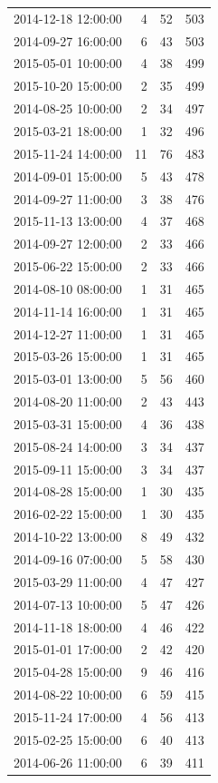\begin{tabular}{lrrr}
2014-12-18 12:00:00 & 4 & 52 & 503 \\
2014-09-27 16:00:00 & 6 & 43 & 503 \\
2015-05-01 10:00:00 & 4 & 38 & 499 \\
2015-10-20 15:00:00 & 2 & 35 & 499 \\
2014-08-25 10:00:00 & 2 & 34 & 497 \\
2015-03-21 18:00:00 & 1 & 32 & 496 \\
2015-11-24 14:00:00 & 11 & 76 & 483 \\
2014-09-01 15:00:00 & 5 & 43 & 478 \\
2014-09-27 11:00:00 & 3 & 38 & 476 \\
2015-11-13 13:00:00 & 4 & 37 & 468 \\
2014-09-27 12:00:00 & 2 & 33 & 466 \\
2015-06-22 15:00:00 & 2 & 33 & 466 \\
2014-08-10 08:00:00 & 1 & 31 & 465 \\
2014-11-14 16:00:00 & 1 & 31 & 465 \\
2014-12-27 11:00:00 & 1 & 31 & 465 \\
2015-03-26 15:00:00 & 1 & 31 & 465 \\
2015-03-01 13:00:00 & 5 & 56 & 460 \\
2014-08-20 11:00:00 & 2 & 43 & 443 \\
2015-03-31 15:00:00 & 4 & 36 & 438 \\
2015-08-24 14:00:00 & 3 & 34 & 437 \\
2015-09-11 15:00:00 & 3 & 34 & 437 \\
2014-08-28 15:00:00 & 1 & 30 & 435 \\
2016-02-22 15:00:00 & 1 & 30 & 435 \\
2014-10-22 13:00:00 & 8 & 49 & 432 \\
2014-09-16 07:00:00 & 5 & 58 & 430 \\
2015-03-29 11:00:00 & 4 & 47 & 427 \\
2014-07-13 10:00:00 & 5 & 47 & 426 \\
2014-11-18 18:00:00 & 4 & 46 & 422 \\
2015-01-01 17:00:00 & 2 & 42 & 420 \\
2015-04-28 15:00:00 & 9 & 46 & 416 \\
2014-08-22 10:00:00 & 6 & 59 & 415 \\
2015-11-24 17:00:00 & 4 & 56 & 413 \\
2015-02-25 15:00:00 & 6 & 40 & 413 \\
2014-06-26 11:00:00 & 6 & 39 & 411 \\

\end{tabular}
